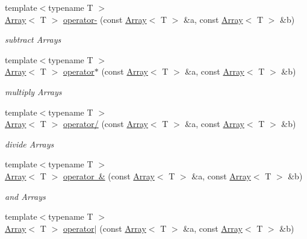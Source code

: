 \begin{DoxyCompactItemize}
{\footnotesize template$<$typename T $>$ }\\\mbox{\hyperlink{classXMLArray_1_1Array}{Array}}$<$ T $>$ \mbox{\hyperlink{namespaceXMLArray_ae8e0bb6934e99151ecdd65abfad39763}{operator-\/}} (const \mbox{\hyperlink{classXMLArray_1_1Array}{Array}}$<$ T $>$ \&a, const \mbox{\hyperlink{classXMLArray_1_1Array}{Array}}$<$ T $>$ \&b)
\begin{DoxyCompactList}\small\item\em subtract Arrays \end{DoxyCompactList}\item 
{\footnotesize template$<$typename T $>$ }\\\mbox{\hyperlink{classXMLArray_1_1Array}{Array}}$<$ T $>$ \mbox{\hyperlink{namespaceXMLArray_ac9f5d1fb8f1862f3d57ddf2745f55b62}{operator$\ast$}} (const \mbox{\hyperlink{classXMLArray_1_1Array}{Array}}$<$ T $>$ \&a, const \mbox{\hyperlink{classXMLArray_1_1Array}{Array}}$<$ T $>$ \&b)
\begin{DoxyCompactList}\small\item\em multiply Arrays \end{DoxyCompactList}\item 
{\footnotesize template$<$typename T $>$ }\\\mbox{\hyperlink{classXMLArray_1_1Array}{Array}}$<$ T $>$ \mbox{\hyperlink{namespaceXMLArray_a3f57a2620a7685e7c85e5a363ee053d1}{operator/}} (const \mbox{\hyperlink{classXMLArray_1_1Array}{Array}}$<$ T $>$ \&a, const \mbox{\hyperlink{classXMLArray_1_1Array}{Array}}$<$ T $>$ \&b)
\begin{DoxyCompactList}\small\item\em divide Arrays \end{DoxyCompactList}\item 
{\footnotesize template$<$typename T $>$ }\\\mbox{\hyperlink{classXMLArray_1_1Array}{Array}}$<$ T $>$ \mbox{\hyperlink{namespaceXMLArray_a4e97a656e19bfbb4c5574c3a60b2ed93}{operator \&}} (const \mbox{\hyperlink{classXMLArray_1_1Array}{Array}}$<$ T $>$ \&a, const \mbox{\hyperlink{classXMLArray_1_1Array}{Array}}$<$ T $>$ \&b)
\begin{DoxyCompactList}\small\item\em and Arrays \end{DoxyCompactList}\item 
{\footnotesize template$<$typename T $>$ }\\\mbox{\hyperlink{classXMLArray_1_1Array}{Array}}$<$ T $>$ \mbox{\hyperlink{namespaceXMLArray_acde7f1ff51638a7a8f4cf4a096e08e1c}{operator$\vert$}} (const \mbox{\hyperlink{classXMLArray_1_1Array}{Array}}$<$ T $>$ \&a, const \mbox{\hyperlink{classXMLArray_1_1Array}{Array}}$<$ T $>$ \&b)

\end{DoxyCompactItemize}

